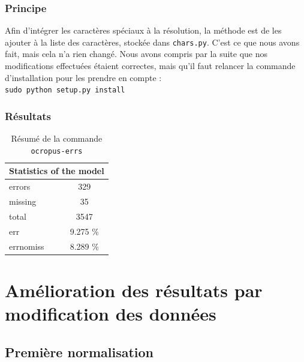 \documentclass{article}
\begin{document}
\subsubsection{Principe}

Afin d'intégrer les caractères spéciaux à la résolution, la méthode est de les ajouter à la liste des caractères, stockée dans \texttt{chars.py}. C'est ce que nous avons fait, mais cela n'a rien changé. Nous avons compris par la suite que nos modifications effectuées étaient correctes, mais qu'il faut relancer la commande d'installation pour les prendre en compte : \\
\texttt{sudo python setup.py install}

\subsubsection{Résultats}

\begin{table}[!h]
\centering
\begin{tabular}{|l|l|lc|l|l|}
\hline
\multicolumn{6}{|c|}{\cellcolor[gray]{0.8}Statistics of the model}                   \\ \hline
\multicolumn{3}{|l|}{errors}    & \multicolumn{3}{c|}{329}      \\ \hline
\multicolumn{3}{|l|}{missing}   & \multicolumn{3}{c|}{35}       \\ \hline
\multicolumn{3}{|l|}{total}     & \multicolumn{3}{c|}{3547}     \\ \hline
\multicolumn{3}{|l|}{err}       & \multicolumn{3}{c|}{9.275 \%} \\ \hline
\multicolumn{3}{|l|}{errnomiss} & \multicolumn{3}{c|}{8.289 \%} \\ \hline
\end{tabular}
\caption{Résumé de la commande \texttt{ocropus-errs}}
\label{t1}
\end{table}

\section{Amélioration des résultats par modification des données}

\subsection{Première normalisation}
\end{document}
